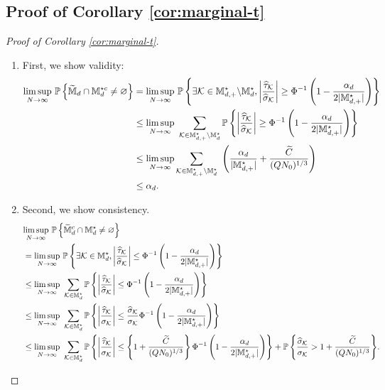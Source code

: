\documentclass[12pt]{article}
\begin{document}
\subsection{Proof of Corollary \ref{cor:marginal-t}}
{
\begin{proof}[Proof of Corollary \ref{cor:marginal-t}]
\begin{enumerate}
    \item First, we show validity:
    \begin{align*}
        \underset{N\to\infty}{\lim\sup}~{\mathbb{P}}\left\{\widetilde{{\mathbb{M}}}_{d}\cap{\mathbb{M}}^{\star c}_d\neq \varnothing\right\} 
        &= \underset{N\to\infty}{\lim\sup}~{\mathbb{P}}\left\{\exists {\mathcal{K}}\in{\mathbb{M}}^{\star }_{d,+}\backslash{\mathbb{M}}^{\star }_{d}, \left|\frac{{\widehat{\tau}}_{{\mathcal{K}}}}{\widehat{\sigma}_{\mathcal{K}}}\right|\ge\Phi^{-1}\left(1-\frac{\alpha_d}{2|{\mathbb{M}}^{\star }_{d,+}|} \right)\right\}\\
        &\le\underset{N\to\infty}{\lim\sup}~ \sum_{{\mathcal{K}}\in{\mathbb{M}}^{\star }_{d,+}\backslash{\mathbb{M}}^{\star }_{d}} {\mathbb{P}}\left\{\left|\frac{{\widehat{\tau}}_{{\mathcal{K}}}}{\widehat{\sigma}_{\mathcal{K}}}\right|\ge\Phi^{-1}\left(1-\frac{\alpha_d}{2|{\mathbb{M}}^{\star }_{d,+}|} \right)\right\}\\
        &\le \underset{N\to\infty}{\lim\sup}\sum_{{\mathcal{K}}\in{\mathbb{M}}^{\star }_{d,+}\backslash{\mathbb{M}}^{\star }_{d}} ~\left(\frac{\alpha_d}{|{\mathbb{M}}^{\star }_{d,+}|} + \frac{\widetilde{C}}{(QN_0)^{1/3}}\right)
         \\
        &\le \alpha_d.
    \end{align*}
    \item Second, we show consistency.
    \begin{align*}
        &\underset{N\to\infty}{\lim\sup}~\bbP\lt\{\tilde{\bbM}^c_{d}\cap\bbM^{\star }_d\neq \varnothing\rt\} \\
        &= \underset{N\to\infty}{\lim\sup}~\bbP\lt\{\exists \cK\in \bbM^{\star }_{d}, \lt|\frac{\htau_{\cK}}{\hat{\sigma}_\cK}\rt|\le\Phi^{-1}\lt(1-\frac{\alpha_d}{2|\bbM^{\star }_{d,+}|} \rt)\rt\}\\
        &\le \underset{N\to\infty}{\lim\sup}~ \sum_{\cK\in\bbM^{\star }_{d}} \bbP\lt\{\lt|\frac{\htau_{\cK}}{\hat{\sigma}_\cK}\rt|\le\Phi^{-1}\lt(1-\frac{\alpha_d}{2|\bbM^{\star }_{d,+}|} \rt)\rt\}\\
        &\le \underset{N\to\infty}{\lim\sup}~ \sum_{\cK\in\bbM^{\star }_{d}} \bbP\lt\{\lt|\frac{\htau_{\cK}}{ {\sigma}_\cK}\rt|\le\frac{\hat{\sigma}_\cK}{\sigma_\cK}\Phi^{-1}\lt(1-\frac{\alpha_d}{2|\bbM^{\star }_{d,+}|} \rt)\rt\}\\
        &\le \underset{N\to\infty}{\lim\sup}~ \sum_{\cK\in\bbM^{\star }_{d}} \bbP\lt\{\lt|\frac{\htau_{\cK}}{ {\sigma}_\cK}\rt|\le\lt\{1+\frac{\tilde{C}}{(QN_0)^{1/3}}\rt\}\Phi^{-1}\lt(1-\frac{\alpha_d}{2|\bbM^{\star }_{d,+}|} \rt)\rt\} + \Prob{\frac{\hat{\sigma}_\cK}{\sigma_\cK}> 1+\frac{\tilde{C}}{(QN_0)^{1/3}}}.

\end{align*}
\end{enumerate}
\end{proof}}
\end{document}
